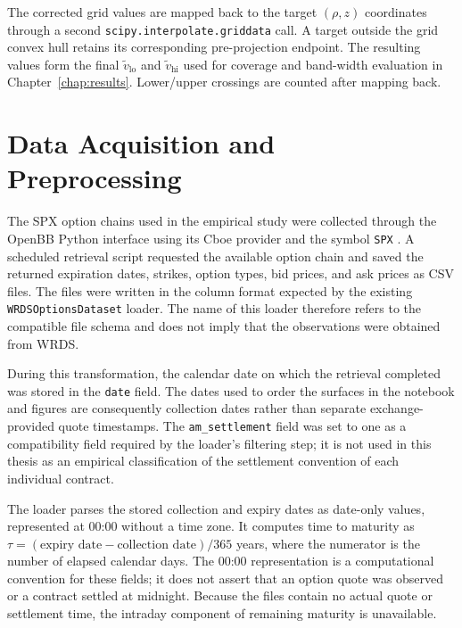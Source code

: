 The corrected grid values are mapped back to the target $(\rho,z)$ coordinates through a second \texttt{scipy.interpolate.griddata} call. A target outside the grid convex hull retains its corresponding pre-projection endpoint. The resulting values form the final $\tilde{v}_{\text{lo}}$ and $\tilde{v}_{\text{hi}}$ used for coverage and band-width evaluation in Chapter~\ref{chap:results}. Lower/upper crossings are counted after mapping back.
\section{Data Acquisition and Preprocessing}
\label{sec:impl_data}

The SPX option chains used in the empirical study were collected through the OpenBB Python interface using its Cboe provider and the symbol \texttt{SPX} \cite{openbb2026options}. A scheduled retrieval script requested the available option chain and saved the returned expiration dates, strikes, option types, bid prices, and ask prices as CSV files. The files were written in the column format expected by the existing \texttt{WRDSOptionsDataset} loader. The name of this loader therefore refers to the compatible file schema and does not imply that the observations were obtained from WRDS.

During this transformation, the calendar date on which the retrieval completed was stored in the \texttt{date} field. The dates used to order the surfaces in the notebook and figures are consequently collection dates rather than separate exchange-provided quote timestamps. The \texttt{am\_settlement} field was set to one as a compatibility field required by the loader's filtering step; it is not used in this thesis as an empirical classification of the settlement convention of each individual contract.

The loader parses the stored collection and expiry dates as date-only values, represented at 00:00 without a time zone. It computes time to maturity as $\tau=(\text{expiry date}-\text{collection date})/365$ years, where the numerator is the number of elapsed calendar days. The 00:00 representation is a computational convention for these fields; it does not assert that an option quote was observed or a contract settled at midnight. Because the files contain no actual quote or settlement time, the intraday component of remaining maturity is unavailable.

